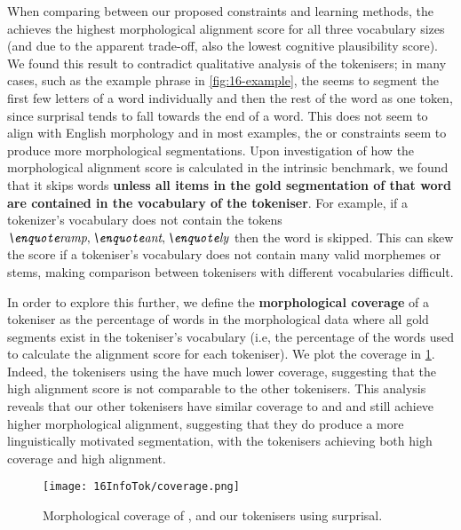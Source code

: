 When comparing between our proposed constraints and learning methods, the  achieves the highest morphological alignment score for all three vocabulary sizes (and due to the apparent trade-off, also the lowest cognitive plausibility score). We found this result to contradict qualitative analysis of the tokenisers; in many cases, such as the example phrase in \cref{fig:16-example}, the  seems to segment the first few letters of a word individually and then the rest of the word as one token, since surprisal tends to fall towards the end of a word. This does not seem to align with English morphology and in most examples, the  or  constraints seem to produce more morphological segmentations. Upon investigation of how the morphological alignment score is calculated in the intrinsic benchmark, we found that it skips words \textbf{unless all items in the gold segmentation of that word are contained in the vocabulary of the tokeniser}. For example, if a tokenizer's vocabulary does not contain the tokens \(\ex{ramp}, \ex{ant}, \ex{ly}\) then the word  is skipped. This can skew the score if a tokeniser's vocabulary does not contain many valid morphemes or stems, making comparison between tokenisers with different vocabularies difficult.

In order to explore this further, we define the \textbf{morphological coverage} of a tokeniser as the percentage of words in the morphological data where all gold segments exist in the tokeniser's vocabulary (i.e, the percentage of the words used to calculate the alignment score for each tokeniser). We plot the coverage in \cref{fig:16-coverage}. Indeed, the tokenisers using the  have much lower coverage, suggesting that the high alignment score is not comparable to the other tokenisers. This analysis reveals that our other tokenisers have similar coverage to \bpe and \bpewp and still achieve higher morphological alignment, suggesting that they do produce a more linguistically motivated segmentation, with the  tokenisers achieving both high coverage and high alignment. 

\begin{figure}[!t]
    \centering
    \texttt{[image: 16InfoTok/coverage.png]}
    \caption{Morphological coverage of \bpe, \bpewp and our \tokname tokenisers using surprisal.}
    \label{fig:16-coverage}
\end{figure}

